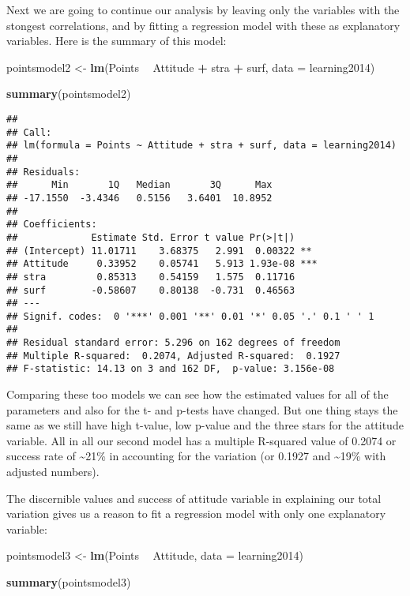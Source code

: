 \documentclass[]{article}
\newenvironment{Shaded}{\begin{snugshade}}{\end{snugshade}}
\newcommand{\KeywordTok}[1]{\textcolor[rgb]{0.13,0.29,0.53}{\textbf{#1}}}
\newcommand{\DataTypeTok}[1]{\textcolor[rgb]{0.13,0.29,0.53}{#1}}
\newcommand{\StringTok}[1]{\textcolor[rgb]{0.31,0.60,0.02}{#1}}
\newcommand{\OperatorTok}[1]{\textcolor[rgb]{0.81,0.36,0.00}{\textbf{#1}}}
\newcommand{\NormalTok}[1]{#1}
\begin{document}
Next we are going to continue our analysis by leaving only the variables
with the stongest correlations, and by fitting a regression model with
these as explanatory variables. Here is the summary of this model:

\begin{Shaded}
\begin{Highlighting}[]
\NormalTok{pointsmodel2 <-}\StringTok{ }\KeywordTok{lm}\NormalTok{(Points }\OperatorTok{~}\StringTok{ }\NormalTok{Attitude }\OperatorTok{+}\StringTok{ }\NormalTok{stra }\OperatorTok{+}\StringTok{ }\NormalTok{surf, }\DataTypeTok{data =}\NormalTok{ learning2014)}

\KeywordTok{summary}\NormalTok{(pointsmodel2)}
\end{Highlighting}
\end{Shaded}

\begin{verbatim}
## 
## Call:
## lm(formula = Points ~ Attitude + stra + surf, data = learning2014)
## 
## Residuals:
##      Min       1Q   Median       3Q      Max 
## -17.1550  -3.4346   0.5156   3.6401  10.8952 
## 
## Coefficients:
##             Estimate Std. Error t value Pr(>|t|)    
## (Intercept) 11.01711    3.68375   2.991  0.00322 ** 
## Attitude     0.33952    0.05741   5.913 1.93e-08 ***
## stra         0.85313    0.54159   1.575  0.11716    
## surf        -0.58607    0.80138  -0.731  0.46563    
## ---
## Signif. codes:  0 '***' 0.001 '**' 0.01 '*' 0.05 '.' 0.1 ' ' 1
## 
## Residual standard error: 5.296 on 162 degrees of freedom
## Multiple R-squared:  0.2074, Adjusted R-squared:  0.1927 
## F-statistic: 14.13 on 3 and 162 DF,  p-value: 3.156e-08
\end{verbatim}

Comparing these too models we can see how the estimated values for all
of the parameters and also for the t- and p-tests have changed. But one
thing stays the same as we still have high t-value, low p-value and the
three stars for the attitude variable. All in all our second model has a
multiple R-squared value of 0.2074 or success rate of
\textasciitilde{}21\% in accounting for the variation (or 0.1927 and
\textasciitilde{}19\% with adjusted numbers).

The discernible values and success of attitude variable in explaining
our total variation gives us a reason to fit a regression model with
only one explanatory variable:

\begin{Shaded}
\begin{Highlighting}[]
\NormalTok{pointsmodel3 <-}\StringTok{ }\KeywordTok{lm}\NormalTok{(Points }\OperatorTok{~}\StringTok{ }\NormalTok{Attitude, }\DataTypeTok{data =}\NormalTok{ learning2014)}

\KeywordTok{summary}\NormalTok{(pointsmodel3)}
\end{Highlighting}
\end{Shaded}
\end{document}

